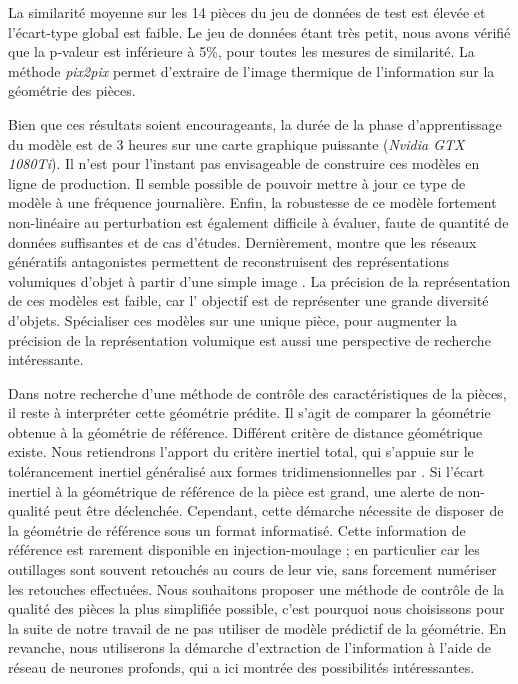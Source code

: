 La similarité moyenne sur les 14 pièces du jeu de données de test est élevée et l'écart-type global est faible.
Le jeu de données étant très petit, nous avons vérifié que la p-valeur est inférieure à 5\%, pour toutes les mesures de similarité.
La méthode \textit{pix2pix} permet d'extraire de l'image thermique de l'information sur la géométrie des pièces.

Bien que ces résultats soient encourageants, la durée de la phase d'apprentissage du modèle est de 3 heures sur une carte graphique puissante (\textit{Nvidia GTX 1080Ti}).
Il n'est pour l'instant pas envisageable de construire ces modèles en ligne de production.
Il semble possible de pouvoir mettre à jour ce type de modèle à une fréquence journalière.
Enfin, la robustesse de ce modèle fortement non-linéaire au perturbation est également difficile à évaluer, faute de quantité de données suffisantes et de cas d'études.
Dernièrement, \citeauthor{wu_learning_2016} montre que les réseaux génératifs antagonistes permettent de reconstruisent des représentations volumiques d'objet à partir d'une simple image \cite{wu_learning_2016}.
La précision de la représentation de ces modèles est faible, car l' objectif est de représenter une grande diversité d'objets.
Spécialiser ces modèles sur une unique pièce, pour augmenter la précision de la représentation volumique est aussi une perspective de recherche intéressante.

Dans notre recherche d'une méthode de contrôle des caractéristiques de la pièces, il reste à interpréter cette géométrie prédite.
Il s'agit  de comparer la géométrie obtenue à la géométrie de référence.
Différent critère de distance géométrique existe.
Nous retiendrons l'apport du critère inertiel total, qui s'appuie sur le tolérancement inertiel généralisé aux formes tridimensionnelles par \citeauthor{adragna_proposition_2010} \cite{adragna_proposition_2010}.
Si l'écart inertiel à la géométrique de référence de la pièce est grand, une alerte de non-qualité peut être déclenchée.
Cependant, cette démarche nécessite de disposer de la géométrie de référence sous un format informatisé.
Cette information de référence est rarement disponible en injection-moulage ; en particulier car les outillages sont souvent retouchés au cours de leur vie, sans forcement numériser les retouches effectuées.
Nous souhaitons proposer une méthode de contrôle de la qualité des pièces la plus simplifiée possible, c'est pourquoi nous choisissons pour la suite de notre travail de ne pas utiliser de modèle prédictif de la géométrie.
En revanche, nous utiliserons la démarche d'extraction de l'information à l'aide de réseau de neurones profonds, qui a ici montrée des possibilités intéressantes.

